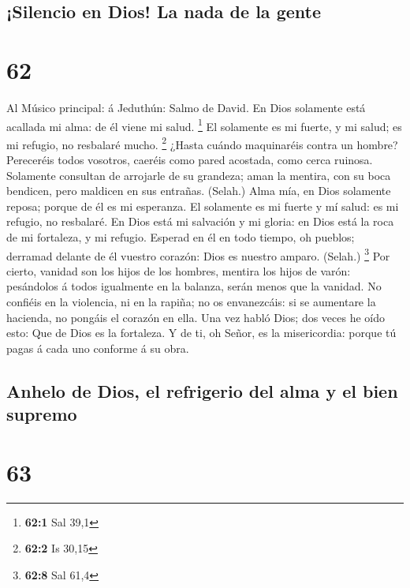 \hypertarget{silencio-en-dios-la-nada-de-la-gente}{%
\subsection{¡Silencio en Dios! La nada de la
gente}\label{silencio-en-dios-la-nada-de-la-gente}}

\hypertarget{section-61}{%
\section{62}\label{section-61}}

 Al Músico principal: á Jeduthún: Salmo de David. En Dios
solamente está acallada mi alma: de él viene mi salud. \footnote{\textbf{62:1}
  Sal 39,1}  El solamente es mi fuerte, y mi salud; es mi
refugio, no resbalaré mucho. \footnote{\textbf{62:2} Is 30,15}
 ¿Hasta cuándo maquinaréis contra un hombre? Pereceréis
todos vosotros, caeréis como pared acostada, como cerca ruinosa.
 Solamente consultan de arrojarle de su grandeza; aman la
mentira, con su boca bendicen, pero maldicen en sus entrañas. (Selah.)
 Alma mía, en Dios solamente reposa; porque de él es mi
esperanza.  El solamente es mi fuerte y mí salud: es mi
refugio, no resbalaré.  En Dios está mi salvación y mi
gloria: en Dios está la roca de mi fortaleza, y mi refugio. 
Esperad en él en todo tiempo, oh pueblos; derramad delante de él vuestro
corazón: Dios es nuestro amparo. (Selah.) \footnote{\textbf{62:8} Sal
  61,4}  Por cierto, vanidad son los hijos de los hombres,
mentira los hijos de varón: pesándolos á todos igualmente en la balanza,
serán menos que la vanidad.  No confiéis en la violencia,
ni en la rapiña; no os envanezcáis: si se aumentare la hacienda, no
pongáis el corazón en ella.  Una vez habló Dios; dos veces
he oído esto: Que de Dios es la fortaleza.  Y de ti, oh
Señor, es la misericordia: porque tú pagas á cada uno conforme á su
obra.

\hypertarget{anhelo-de-dios-el-refrigerio-del-alma-y-el-bien-supremo}{%
\subsection{Anhelo de Dios, el refrigerio del alma y el bien
supremo}\label{anhelo-de-dios-el-refrigerio-del-alma-y-el-bien-supremo}}

\hypertarget{section-62}{%
\section{63}\label{section-62}}


